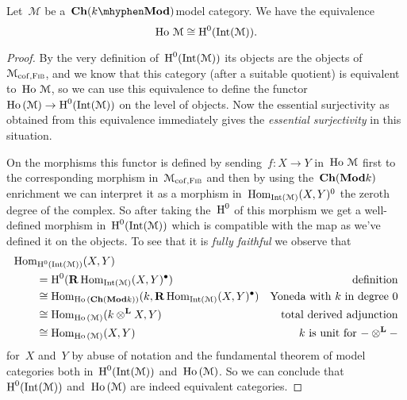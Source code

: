 \begin{proposition}
  \label{proposition:internal-category-is-dg-enrichment}
  Let~$\mathcal{M}$ be a~$\Ch(k\mhyphen\Mod)$\dash model category. We have the equivalence
  \begin{equation}
    \operatorname{\mathrm{Ho} \,}\mathcal{M}\cong\operatorname{H}^0(\operatorname{Int}(\mathcal{M})).
  \end{equation}

  \begin{proof}
    By the very definition of~$\operatorname{H}^0(\operatorname{Int}(\mathcal{M}))$ its objects are the objects of~$\mathcal{M}_{\mathrm{cof},\textsc{Fib}}$, and we know that this category (after a suitable quotient) is equivalent to~$\operatorname{\mathrm{Ho} \,}\mathcal{M}$, so we can use this equivalence to define the functor~$\operatorname{\mathrm{Ho} \,}(\mathcal{M})\to\operatorname{H}^0(\operatorname{Int}(\mathcal{M}))$ on the level of objects. Now the essential surjectivity as obtained from this equivalence immediately gives the \emph{essential surjectivity} in this situation.

    On the morphisms this functor is defined by sending~$f\colon X\to Y$ in~$\operatorname{\mathrm{Ho} \,}\mathcal{M}$ first to the corresponding morphism in~$\mathcal{M}_{\mathrm{cof},\textsc{Fib}}$ and then by using the~$\mathbf{Ch}(\mathbf{Mod}{k})$\dash enrichment we can interpret it as a morphism in~$\mathrm{Hom}_{\operatorname{Int}(\mathcal{M})}(X,Y)^0$ the zeroth degree of the complex. So after taking the~$\operatorname{H}^0$ of this morphism we get a well-defined morphism in~$\operatorname{H}^0(\operatorname{Int}(\mathcal{M}))$ which is compatible with the map as we've defined it on the objects. To see that it is \emph{fully faithful} we observe that
    \begin{equation}
      \begin{aligned}
        &\mathrm{Hom}_{\operatorname{H}^0(\operatorname{Int}(\mathcal{M}))}(X,Y) \\
        &\qquad=\operatorname{H}^0(\operatorname{\mathbf{R}}\mathrm{Hom}_{\operatorname{Int}(\mathcal{M})}(X,Y)^\bullet) & \text{definition} \\ 
        &\qquad\cong\mathrm{Hom}_{\operatorname{\mathrm{Ho} \,}(\mathbf{Ch}(\mathbf{Mod}{k}))}(k,\operatorname{\mathbf{R}}\mathrm{Hom}_{\operatorname{Int}(\mathcal{M})}(X,Y)^\bullet) & \text{Yoneda with~$k$ in degree 0} \\
        &\qquad\cong\mathrm{Hom}_{\operatorname{\mathrm{Ho} \,}(\mathcal{M})}(k\otimes^{\mathbf{L}} X,Y) & \text{total derived adjunction} \\
        &\qquad\cong\mathrm{Hom}_{\operatorname{\mathrm{Ho} \,}(\mathcal{M})}(X,Y) & \text{$k$ is unit for~$-\otimes^{\mathbf{L}}-$}
      \end{aligned}
    \end{equation}
    for~$X$ and~$Y$ by abuse of notation and the fundamental theorem of model categories both in~$\operatorname{H}^0(\operatorname{Int}(\mathcal{M}))$ and~$\operatorname{\mathrm{Ho} \,}(\mathcal{M})$. So we can conclude that~$\operatorname{H}^0(\operatorname{Int}(\mathcal{M}))$ and~$\operatorname{\mathrm{Ho} \,}(\mathcal{M})$ are indeed equivalent categories.
  \end{proof}
\end{proposition}



